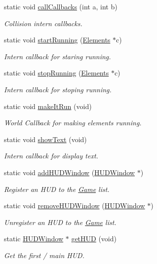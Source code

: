 \begin{DoxyCompactItemize}
\item 
static void \hyperlink{class_game_a34c8791251f785d270f757b6eff4ea56}{call\+Callbacks} (int a, int b)
\begin{DoxyCompactList}\small\item\em Collision intern callbacks. \end{DoxyCompactList}\item 
static void \hyperlink{class_game_a27ad8f2a6f8f098cc28377df13c4ec2e}{start\+Running} (\hyperlink{class_elements}{Elements} $\ast$c)
\begin{DoxyCompactList}\small\item\em Intern callback for staring running. \end{DoxyCompactList}\item 
static void \hyperlink{class_game_a9394f6f0c90bde35fb0bd4ca3316c3f0}{stop\+Running} (\hyperlink{class_elements}{Elements} $\ast$c)
\begin{DoxyCompactList}\small\item\em Intern callback for stoping running. \end{DoxyCompactList}\item 
static void \hyperlink{class_game_ae763ecd953645a586b638a46b908ca5a}{make\+It\+Run} (void)
\begin{DoxyCompactList}\small\item\em World Callback for making elements running. \end{DoxyCompactList}\item 
static void \hyperlink{class_game_a5cf54b4cf9d8bf024f8936fedf11ccea}{show\+Text} (void)
\begin{DoxyCompactList}\small\item\em Intern callback for display text. \end{DoxyCompactList}\item 
static void \hyperlink{class_game_a88d713d54d9303c38c897635c7c04cf4}{add\+H\+U\+D\+Window} (\hyperlink{class_h_u_d_window}{H\+U\+D\+Window} $\ast$)
\begin{DoxyCompactList}\small\item\em Register an H\+U\+D to the \hyperlink{class_game}{Game} list. \end{DoxyCompactList}\item 
static void \hyperlink{class_game_a80e17eab80071411eff5eb38d6b7fc76}{remove\+H\+U\+D\+Window} (\hyperlink{class_h_u_d_window}{H\+U\+D\+Window} $\ast$)
\begin{DoxyCompactList}\small\item\em Unregister an H\+U\+D to the \hyperlink{class_game}{Game} list. \end{DoxyCompactList}\item 
static \hyperlink{class_h_u_d_window}{H\+U\+D\+Window} $\ast$ \hyperlink{class_game_a8339342d69fc241d349da9404ce088c5}{get\+H\+U\+D} (void)
\begin{DoxyCompactList}\small\item\em Get the first / main H\+U\+D. \end{DoxyCompactList}\end{DoxyCompactItemize}
